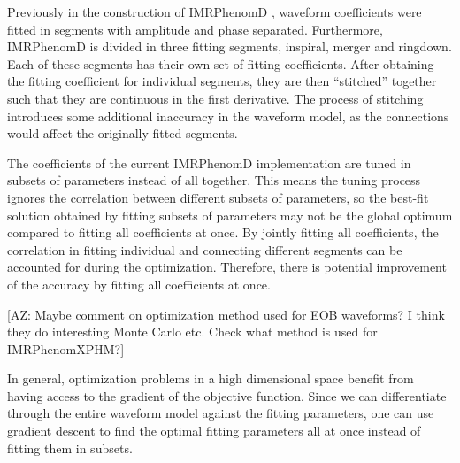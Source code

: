 \documentclass[twocolumn]{aastex631}
\newcommand{\AZ}[1]{{\color{Burnt}[AZ: #1]}}
\begin{document}
Previously in the construction of IMRPhenomD \citep{Khan:2015jqa}, waveform
coefficients were fitted in segments with amplitude and phase separated.
Furthermore, IMRPhenomD is divided in three fitting segments, inspiral, merger and ringdown.
Each of these segments has their own set of fitting coefficients.
After obtaining the fitting coefficient for individual segments, they are then ``stitched'' together such that they are continuous in the first derivative.
The process of stitching introduces some additional
inaccuracy in the waveform model, as the connections would affect the originally
fitted segments.

The coefficients of the current IMRPhenomD implementation are tuned in subsets
of parameters instead of all together. This means the tuning process ignores the
correlation between different subsets of parameters, so the best-fit
solution obtained by fitting subsets of parameters may not be the global
optimum compared to fitting all coefficients at once. By jointly
fitting all coefficients, the correlation in fitting individual and connecting
different segments can be accounted for during the optimization. Therefore, there is
potential improvement of the accuracy by fitting all coefficients at once.

\AZ{Maybe comment on optimization method used for EOB waveforms?
I think they do interesting Monte Carlo etc. Check what method is used 
for IMRPhenomXPHM?}

In general, optimization problems in a high dimensional space benefit from
having access to the gradient of the objective function. Since we can
differentiate through the entire waveform model against the fitting parameters,
one can use gradient descent to find the optimal fitting parameters all at once
instead of fitting them in subsets.
\end{document}
